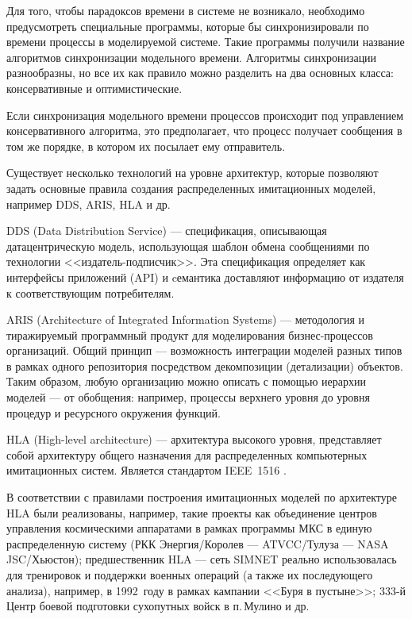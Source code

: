 Для того, чтобы парадоксов времени в системе не возникало, необходимо предусмотреть специальные программы, которые бы синхронизировали по времени процессы в моделируемой системе. Такие программы получили название алгоритмов синхронизации модельного времени. Алгоритмы синхронизации разнообразны, но все их как правило можно разделить на два основных класса: консервативные и оптимистические.

Если синхронизация модельного времени процессов происходит под управлением консервативного алгоритма, это предполагает, что процесс получает сообщения в том же порядке, в котором их посылает ему отправитель.


Существует несколько технологий на уровне архитектур, которые позволяют задать основные правила создания распределенных имитационных моделей, например DDS, ARIS, HLA и др.


DDS (Data Distribution Service)  --- спецификация, описывающая датацентрическую модель, использующая шаблон обмена сообщениями по технологии <<издатель-подписчик>>. Эта спецификация определяет как интерфейсы приложений (API) и cемантика доставляют информацию от издателя к соответствующим потребителям.

ARIS (Architecture of Integrated Information Systems)  ---  методология и тиражируемый программный продукт для моделирования бизнес-процессов организаций. Общий принцип --- возможность интеграции моделей разных типов в рамках одного репозитория посредством декомпозиции (детализации) объектов. Таким образом, любую организацию можно описать с помощью иерархии моделей --- от обобщения: например, процессы верхнего уровня до уровня процедур и ресурсного окружения функций.

HLA (High-level architecture) --- архитектура высокого уровня, представляет собой архитектуру общего назначения для распределенных компьютерных имитационных систем. Является стандартом IEEE~1516 \cite{1516}.


В соответствии с правилами построения имитационных моделей по архитектуре HLA были реализованы, например, такие проекты как объединение центров управления космическими аппаратами в рамках программы МКС в единую распределенную систему (РКК Энергия/Королев --- ATVCC/Тулуза --- NASA JSC/Хьюстон); предшественник HLA --- сеть SIMNET реально использовалась для тренировок и поддержки военных операций (а также их последующего анализа), например, в 1992~году в рамках кампании <<Буря в пустыне>>; 333-й Центр боевой подготовки сухопутных войск в п.\,Мулино и др.

